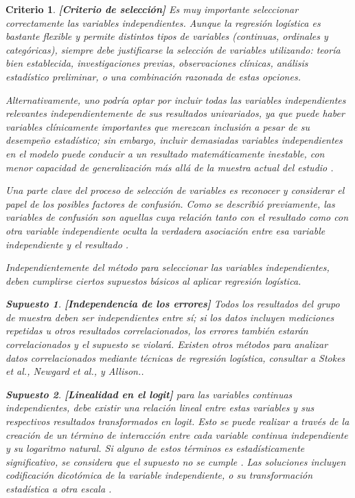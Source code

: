 \documentclass[12pt]{article}
\newtheorem{Criterio}{Criterio}%
\newtheorem{Sup}{Supuesto}%
\begin{document}
\begin{Criterio}
\textbf{[Criterio de selecci\'on]} Es muy importante seleccionar correctamente las variables independientes. Aunque la regresi\'on log\'istica es bastante flexible y permite distintos tipos de variables (continuas, ordinales y categ\'oricas), siempre debe justificarse la selecci\'on de variables utilizando: teor\'ia bien establecida, investigaciones previas, observaciones cl\'inicas, an\'alisis estad\'istico preliminar, o una combinaci\'on razonada de estas opciones.

Alternativamente, uno podr\'ia optar por incluir todas las variables independientes relevantes independientemente de sus resultados univariados, ya que puede haber variables cl\'inicamente importantes que merezcan inclusi\'on a pesar de su desempe\~no estad\'istico; sin embargo,  incluir demasiadas variables independientes en el modelo puede conducir a un resultado matem\'aticamente inestable, con menor capacidad de generalizaci\'on m\'as all\'a de la muestra actual del estudio \cite{tabachnick2007,hosmer2000}.

Una parte clave del proceso de selecci\'on de variables es reconocer y considerar el papel de los posibles factores de confusi\'on. Como se describi\'o previamente, las variables de confusi\'on son aquellas cuya relaci\'on tanto con el resultado como con otra variable independiente oculta la verdadera asociaci\'on entre esa variable independiente y el resultado \cite{darlington1990,hosmer2000}.

Independientemente del m\'etodo para seleccionar las variables independientes, deben cumplirse ciertos supuestos b\'asicos al aplicar regresi\'on log\'istica. 

\begin{Sup}
\textbf{[Independencia de los errores]} Todos los resultados del grupo de muestra deben ser independientes entre s\'i; si los datos incluyen mediciones repetidas u otros resultados correlacionados, los errores tambi\'en estar\'an correlacionados y el supuesto se violar\'a.\cite{tabachnick2007} Existen otros m\'etodos para analizar datos correlacionados mediante t\'ecnicas de regresi\'on log\'istica, consultar a Stokes et al.,\cite{stokes2000} Newgard et al.,\cite{newgard2004, newgard2007} y Allison.\cite{allison1999}.
\end{Sup}

\begin{Sup} \textbf{[Linealidad en el logit]} para las variables continuas independientes, debe existir una relaci\'on lineal entre estas variables y sus respectivos resultados transformados en logit. Esto se puede realizar a trav\'es de la creaci\'on de un t\'ermino de interacci\'on entre cada variable continua independiente y su logaritmo natural. Si alguno de estos t\'erminos es estad\'isticamente significativo, se considera que el supuesto no se cumple \cite{tabachnick2007,hosmer2000}. Las soluciones incluyen codificaci\'on dicot\'omica de la variable independiente,\cite{hosmer2000} o su transformaci\'on estad\'istica a otra escala \cite{tabachnick2007,hosmer2000}.
\end{Sup}


\end{Criterio}
\end{document}
